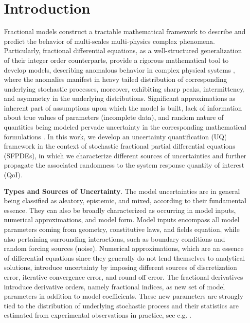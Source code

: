 %
\section{Introduction}
\label{Sec: Introduction}
%

Fractional models construct a tractable mathematical framework to describe and predict the behavior of multi-scales multi-physics complex phenomena. Particularly, fractional differential equations, as a well-structured generalization of their integer order counterparts, provide a rigorous mathematical tool to develop models, describing anomalous behavior in complex physical systems \cite{zhang2017review,jaishankar2014,jha2003evidence, Castillo2004Plasma,jaishankar2013,naghibolhosseini2015estimation,naghibolhosseini2017fractional,meer01, meral2010fractional}, where the anomalies manifest in heavy tailed distribution of corresponding underlying stochastic processes, moreover, exhibiting sharp peaks, intermittency, and asymmetry in the underlying distributions. Significant approximations as inherent part of assumptions upon which the model is built, lack of information about true values of parameters (incomplete data), and random nature of quantities being modeled pervade uncertainty in the corresponding mathematical formulations \cite{cullen1999probabilistic,roy2011comprehensive}. In this work, we develop an uncertainty quantification (UQ) framework in the context of stochastic fractional partial differential equations (SFPDEs), in which we characterize different sources of uncertainties and further propagate the associated randomness to the system response quantity of interest (QoI).


\vspace{0.1 in}
%
\noindent\textbf{Types and Sources of Uncertainty}.
%
The model uncertainties are in general being classified as aleatory, epistemic, and mixed, according to their fundamental essence. They can also be broadly characterized as occurring in model inputs, numerical approximations, and model form. Model inputs encompass all model parameters coming from geometry, constitutive laws, and fields equation, while also pertaining surrounding interactions, such as boundary conditions and random forcing sources (noise). Numerical approximations, which are an essence of differential equations since they generally do not lend themselves to analytical solutions, introduce uncertainty by imposing different sources of discretization error, iterative convergence error, and round off error. The fractional derivatives introduce derivative orders, namely fractional indices, as new set of model parameters in addition to model coefficients. These new parameters are strongly tied to the distribution of underlying stochastic process and their statistics are estimated from experimental observations in practice, see e.g.  \cite{benson2000application,baeumer2001subordinated}. 




